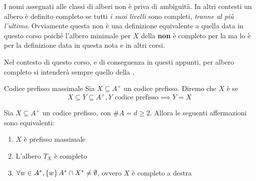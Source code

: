 \begin{note}{}
  I nomi assegnati alle classi di alberi non è priva di ambiguità.
  In altri contesti un albero è definito completo se tutti \textit{i suoi livelli} sono completi, \textit{tranne al più l'ultimo}.
  Ovviamente questa non è una definizione equivalente a quella data in questo corso poiché l'albero minimale per \(X\) della  \textbf{non} è completo per la  ma lo è per la definizione data in questa nota e in altri corsi.

  Nel contesto di questo corso, e di conseguenza in questi appunti, per albero completo si intenderà sempre quello della .
\end{note}

\begin{definition}{Codice prefisso massimale}
  Sia \(X \subseteq A^+\) un codice prefisso. Diremo che \(X\) è  se
  \[X \subseteq Y \subseteq A^+, Y \text{ codice prefisso} \implies Y = X\]
\end{definition}

\begin{theorem}[label=thm:prefix_code_properties]{}
  Sia \(X \subseteq A^+\) un codice prefisso, con \(\# A = d \geq 2\). Allora le seguenti affermazioni sono equivalenti:
  \begin{enumerate}
    \item \(X\) è prefisso massimale
    \item L'albero \(T_X\) è completo
    \item \(\forall w \in A^*, \set{w}A^*\cap X^* \neq \emptyset\), ovvero \(X\) è completo a destra
  \end{enumerate}
\end{theorem}


